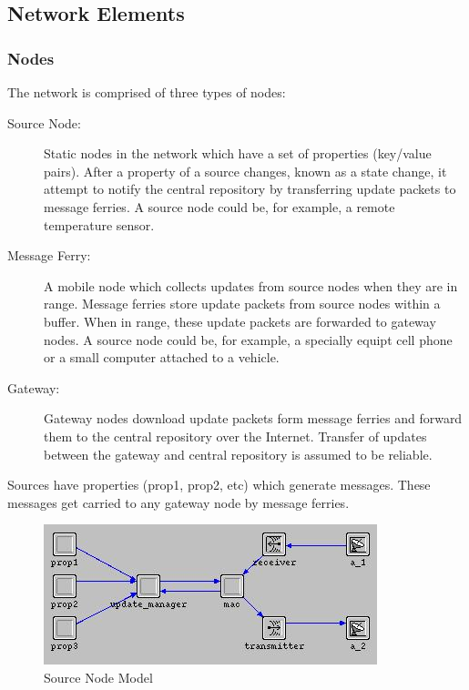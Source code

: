 \subsection{Network Elements}



\subsubsection{Nodes}

The network is comprised of three types of nodes:

\begin{description}

\item[Source Node: ] 
Static nodes in the network which have a set of properties (key/value pairs).
After a property of a source changes, known as a state change, it attempt to notify the central repository by transferring update packets to message ferries.
A source node could be, for example, a remote temperature sensor.
\item[Message Ferry: ] 
A mobile node which collects updates from source nodes when they are in range.
Message ferries store update packets from source nodes within a buffer. 
When in range, these update packets are forwarded to gateway nodes.
A source node could be, for example, a specially equipt cell phone or a small computer attached to a vehicle. 
\item[Gateway: ]
Gateway nodes download update packets form message ferries and forward them to the central repository over the Internet.
Transfer of updates between the gateway and central repository is assumed to be reliable. 

\end{description}


Sources have properties (prop1, prop2, etc) which generate messages. These messages get carried to any gateway node by message ferries.

\begin{figure}[h]
    \centering
    \includegraphics[width=.5\textwidth]{images/source}
    \caption{Source Node Model}
    \label{fig:source}
\end{figure}

